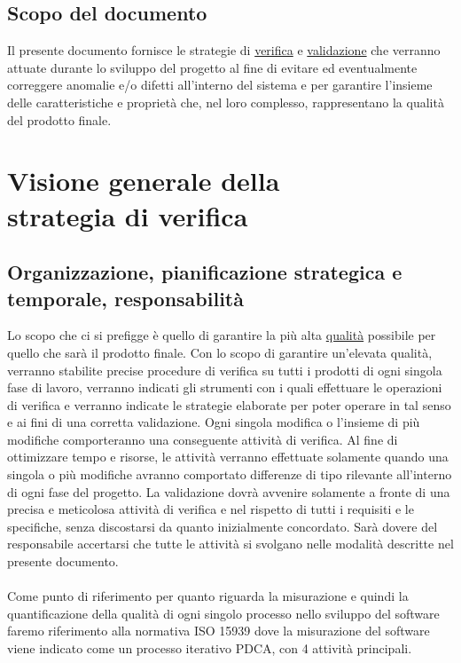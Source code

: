 \section{Scopo del documento}

Il presente documento fornisce le strategie di \underline{verifica} e
\underline{validazione} che verranno attuate durante lo sviluppo del progetto al
fine di evitare ed eventualmente correggere anomalie e/o difetti all'interno del
sistema e per garantire l'insieme delle caratteristiche e propriet\`a che, nel
loro complesso, rappresentano la qualit\`a del prodotto finale.




\chapter{Visione generale della \\strategia di verifica}
\thispagestyle{fancy} %

\section{Organizzazione, pianificazione strategica e \\temporale,
responsabilit\`a}

Lo scopo che ci si prefigge \`e quello di garantire la pi\`u alta
\underline{qualit\`a} possibile per quello che sar\`a il prodotto finale. Con lo
scopo di garantire un'elevata qualit\`a, verranno stabilite precise procedure di
verifica su tutti i prodotti di ogni singola fase di lavoro, verranno indicati
gli strumenti con i quali effettuare le operazioni di verifica e verranno
indicate le strategie elaborate per poter operare in tal senso e ai fini di una
corretta validazione. Ogni singola modifica o l'insieme di pi\`u modifiche
comporteranno una conseguente attivit\`a di verifica. Al fine di
ottimizzare tempo e risorse, le attivit\`a verranno effettuate solamente quando
una singola o pi\`u modifiche avranno comportato differenze di tipo rilevante
all'interno di ogni fase del progetto. La validazione dovr\`a avvenire
solamente a fronte di una precisa e meticolosa attivit\`a di verifica e nel
rispetto di tutti i requisiti e le specifiche, senza discostarsi da
quanto inizialmente concordato. Sar\`a dovere del responsabile accertarsi che
tutte le attivit\`a si svolgano nelle modalit\`a descritte nel presente documento.
\\
\\ 
Come punto di riferimento per quanto riguarda la misurazione e quindi la
quantificazione della qualit\`a di ogni singolo processo nello sviluppo del
software faremo riferimento alla normativa ISO 15939 dove la misurazione del
software viene indicato come un processo iterativo PDCA, con 4 attivit\`a
principali.

